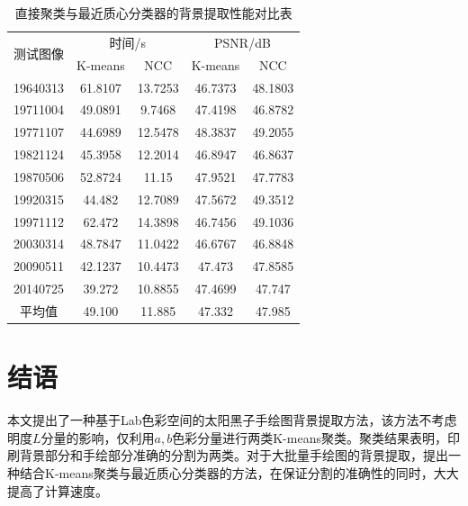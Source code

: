 \documentclass[UTF8,a4paper,twoside]{ctexart}
\begin{document}
\begin{table}[H]
\centering
\caption{直接聚类与最近质心分类器的背景提取性能对比表}
\label{compareTable}
\begin{tabular}{ccccc}
  \hline
  \multirow{2}{*}{测试图像} & \multicolumn{2}{c}{时间/s} & \multicolumn{2}{c}{PSNR/dB} \\
                            & K-means     & NCC       & K-means     & NCC       \\
  \hline
  19640313              & 61.8107     & 13.7253    & 46.7373     & 48.1803    \\
  19711004              & 49.0891     & 9.7468     & 47.4198     & 46.8782    \\
  19771107              & 44.6989     & 12.5478    & 48.3837     & 49.2055    \\
  19821124              & 45.3958     & 12.2014    & 46.8947     & 46.8637    \\
  19870506              & 52.8724     & 11.15      & 47.9521     & 47.7783    \\
  19920315              & 44.482      & 12.7089    & 47.5672     & 49.3512    \\
  19971112              & 62.472      & 14.3898    & 46.7456     & 49.1036    \\
  20030314              & 48.7847     & 11.0422    & 46.6767     & 46.8848    \\
  20090511              & 42.1237     & 10.4473    & 47.473      & 47.8585    \\
  20140725              & 39.272      & 10.8855    & 47.4699     & 47.747    \\
  \hline
  平均值                 & 49.100      & 11.885     & 47.332      & 47.985    \\
  \hline
                                                                   
\end{tabular}
\end{table}




\section{结语}

本文提出了一种基于Lab色彩空间的太阳黑子手绘图背景提取方法，该方法不考虑明度$L$分量的影响，仅利用$a, b$色彩分量进行两类K-means聚类。聚类结果表明，印刷背景部分和手绘部分准确的分割为两类。对于大批量手绘图的背景提取，提出一种结合K-means聚类与最近质心分类器的方法，在保证分割的准确性的同时，大大提高了计算速度。




\end{document}
